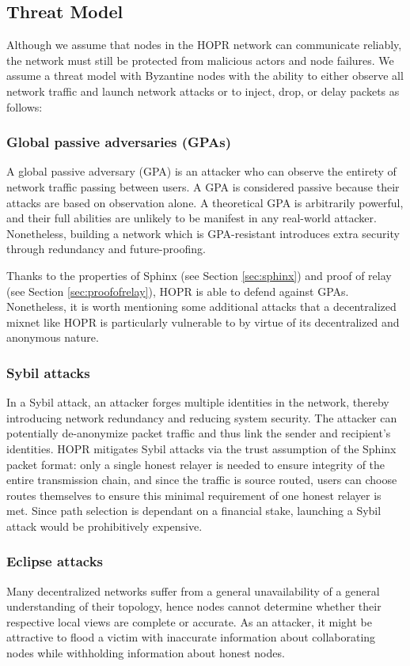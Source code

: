\subsection{Threat Model}

Although we assume that nodes in the HOPR network can communicate reliably, the network must still be protected from malicious actors and node failures. We assume a threat model with Byzantine nodes with the ability to either observe all network traffic and launch network attacks or to inject, drop, or delay packets as follows:

\subsubsection{Global passive adversaries (GPAs)} A global passive adversary (GPA) is an attacker who can observe the entirety of network traffic passing between users. A GPA is considered passive because their attacks are based on observation alone. A theoretical GPA is arbitrarily powerful, and their full abilities are unlikely to be manifest in any real-world attacker. Nonetheless, building a network which is GPA-resistant introduces extra security through redundancy and future-proofing.

Thanks to the properties of Sphinx (see Section \ref{sec:sphinx}) and proof of relay (see Section \ref{sec:proofofrelay}), HOPR is able to defend against GPAs. Nonetheless, it is worth mentioning some additional attacks that a decentralized mixnet like HOPR is particularly vulnerable to by virtue of its decentralized and anonymous nature.

\subsubsection{Sybil attacks}
In a Sybil attack, an attacker forges multiple identities in the network, thereby introducing network redundancy and reducing system security. The attacker can potentially de-anonymize packet traffic and thus link the sender and recipient's identities. HOPR mitigates Sybil attacks via the trust assumption of the Sphinx packet format: only a single honest relayer is needed to ensure integrity of the entire transmission chain, and since the traffic is source routed, users can choose routes themselves to ensure this minimal requirement of one honest relayer is met. Since path selection is dependant on a financial stake, launching a Sybil attack would be prohibitively expensive.

\subsubsection{Eclipse attacks}
Many decentralized networks suffer from a general unavailability of a general understanding of their topology, hence nodes cannot determine whether their respective local views are complete or accurate. As an attacker, it might be attractive to flood a victim with inaccurate information about collaborating nodes while withholding information about honest nodes.

